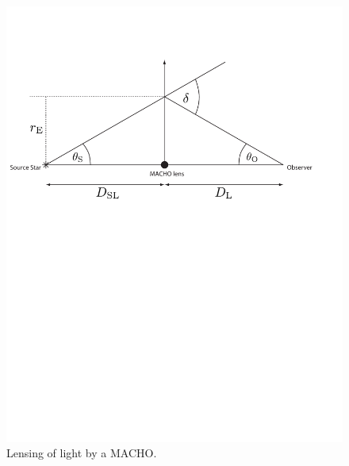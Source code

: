 \begin{figure}[p]
\begin{center}
\includegraphics[width=\linewidth]{figures/macho/lensing}
\end{center}
\caption[Gravitational Lensing of Light By a MACHO]{%
\label{f:macholens}%
Lensing of light by a MACHO.
}
\end{figure}


